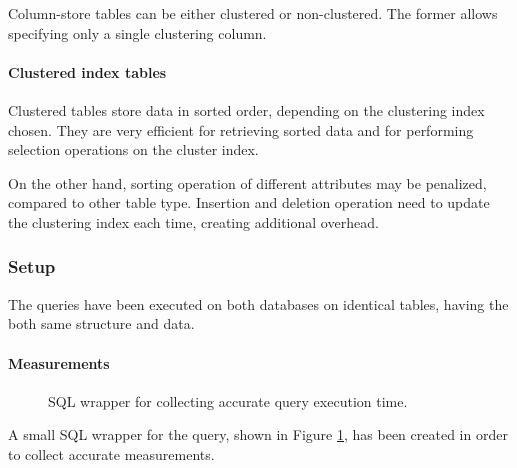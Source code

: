         Column-store tables can be either clustered or non-clustered.
        The former allows specifying only a single clustering column.
        
    \paragraph{Clustered index tables}
        Clustered tables store data in sorted order, depending on the clustering index chosen.
        They are very efficient for retrieving sorted data and for performing selection operations on the cluster index.
        
        On the other hand, sorting operation of different attributes may be penalized, compared to other table type.
        Insertion and deletion operation need to update the clustering index each time, creating additional overhead.
        
\subsubsection{Setup}
    The queries have been executed on both databases on identical tables, having the both same structure and data.
    
    \paragraph{Measurements}
        \begin{figure}
            \centering
            \caption{SQL wrapper for collecting accurate query execution time.}
            \label{fig:tests:perf:queries:wrapper}
        \end{figure}
    
        A small SQL wrapper for the query, shown in Figure \ref{fig:tests:perf:queries:wrapper}, has been created in order to collect accurate measurements.
        
